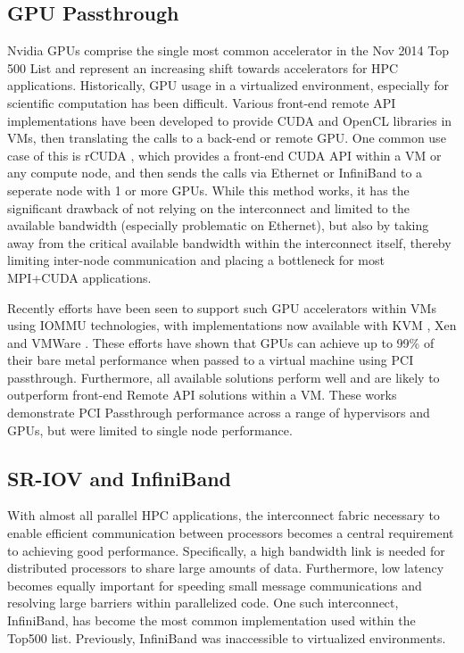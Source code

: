 \documentclass{sigplanconf}
\begin{document}
\subsection{GPU Passthrough}

Nvidia GPUs comprise the single most common accelerator in the Nov 2014 Top 500 List \cite{www-top500} and represent an increasing shift towards accelerators for HPC applications. Historically, GPU usage in a virtualized environment, especially for scientific computation has been difficult. Various front-end remote API implementations have been developed to provide CUDA and OpenCL libraries in VMs, then translating the calls to a back-end or remote GPU. One common use case of this is rCUDA \cite{rcuda}, which provides a front-end CUDA API within a VM or any compute node, and then sends the calls via Ethernet or InfiniBand to a seperate node with 1 or more GPUs. While this method works, it has the significant drawback of not relying on the interconnect and limited to the available bandwidth (especially problematic on Ethernet), but also by taking away from the critical available bandwidth within the interconnect itself, thereby limiting inter-node communication and placing a bottleneck for most MPI+CUDA applications.

Recently efforts have been seen to support such GPU accelerators within VMs using IOMMU technologies, with implementations now available with KVM \cite{Walters2014cloud}, Xen \cite{Younge2014hpgc} and VMWare \cite{Vu2014}.  These efforts have shown that GPUs can achieve up to 99\% of their bare metal performance when passed to a virtual machine using PCI passthrough. Furthermore, all available solutions perform well and are likely to outperform front-end Remote API solutions within a VM\cite{Walters2014cloud}.  These works demonstrate PCI Passthrough performance across a range of hypervisors and GPUs, but were limited to single node performance. 

\subsection{SR-IOV and InfiniBand}

With almost all parallel HPC applications, the interconnect fabric necessary to enable efficient communication between processors becomes a central requirement to achieving good performance. Specifically, a high bandwidth link is needed for distributed processors to share large amounts of data. Furthermore, low latency becomes equally important for speeding small message communications and resolving large barriers within parallelized code. One such interconnect, InfiniBand, has become the most common implementation used within the Top500 list. Previously, InfiniBand was inaccessible to virtualized environments.  
\end{document}
